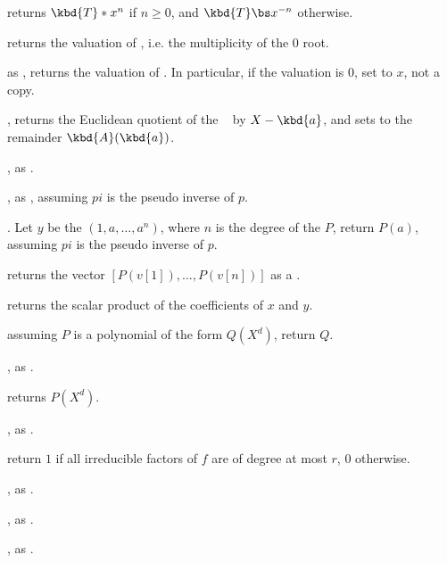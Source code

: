  returns $\kbd{T} * x^n$ if $n\geq 0$,
and $\kbd{T} \bs x^{-n}$ otherwise.

 returns the valuation of , i.e. the
multiplicity of the $0$ root.

 as , returns the
valuation of . In particular, if the valuation is $0$, set 
to $x$, not a copy.

, returns the
Euclidean quotient of the ~ by $X - \kbd{a}$, and sets
 to the remainder $ \kbd{A}(\kbd{a})$.

, as .

, as ,
assuming $pi$ is the pseudo inverse of $p$.

. Let $y$ be
the  $(1,a,\dots,a^n)$, where $n$ is the degree of the
 $P$, return $P(a)$, assuming $pi$ is the pseudo inverse of $p$.

 returns the vector
$[P(v[1]),\ldots,P(v[n])]$ as a .

 returns the scalar product
of the coefficients of $x$ and $y$.

 assuming $P$ is a polynomial of the
form $Q(X^d)$, return $Q$.

, as .

 returns $P(X^d)$.


, as .

 return $1$ if all
irreducible factors of $f$ are of degree at most $r$, $0$ otherwise.

, as .

, as .

,
as .

